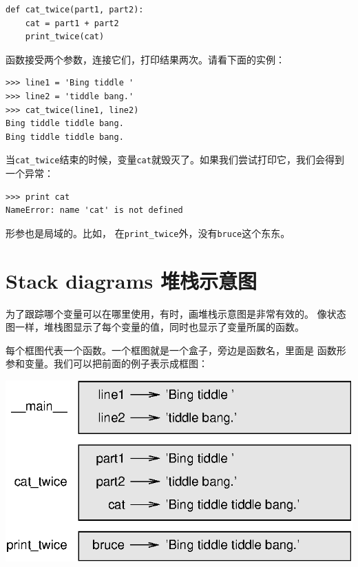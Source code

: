 \beforeverb
\begin{verbatim}
def cat_twice(part1, part2):
    cat = part1 + part2
    print_twice(cat)
\end{verbatim}
\afterverb

函数接受两个参数，连接它们，打印结果两次。请看下面的实例：


\beforeverb
\begin{verbatim}
>>> line1 = 'Bing tiddle '
>>> line2 = 'tiddle bang.'
>>> cat_twice(line1, line2)
Bing tiddle tiddle bang.
Bing tiddle tiddle bang.
\end{verbatim}
\afterverb

当\verb"cat_twice"结束的时候，变量{\tt cat}就毁灭了。如果我们尝试打印它，我们会得到一个异常：


\beforeverb
\begin{verbatim}
>>> print cat
NameError: name 'cat' is not defined
\end{verbatim}
\afterverb

形参也是局域的。比如， 在\verb"print_twice"外，没有{\tt bruce}这个东东。


\section{Stack diagrams 堆栈示意图}
\label{stackdiagram}

为了跟踪哪个变量可以在哪里使用，有时，画堆栈示意图是非常有效的。
像状态图一样，堆栈图显示了每个变量的值，同时也显示了变量所属的函数。


每个框图代表一个函数。一个框图就是一个盒子，旁边是函数名，里面是
函数形参和变量。我们可以把前面的例子表示成框图：

\beforefig
\centerline{\includegraphics{figs/stack.eps}}
\afterfig

